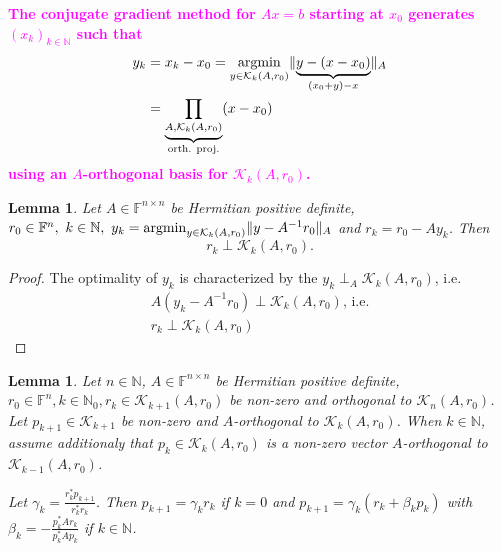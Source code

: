 \documentclass[12pt]{article}
\newtheorem{lemma}[theorem]{Lemma}
\theoremstyle{definition}
\theoremstyle{remark}
\numberwithin{equation}{section}
\newcommand{\F}{\mathbb{F}}
\newcommand{\N}{\mathbb{N}}
\newcommand{\K}{\mathcal{K}}
\DeclarePairedDelimiter{\norm}{\lVert}{\rVert}
\DeclareMathOperator{\argmin}{argmin}
\begin{document}
\begin{mdframed}[linecolor=magenta, linewidth=1pt]
  \textcolor{magenta}{\textbf{
      The conjugate gradient method for $Ax = b$ starting at $x_0$ generates $(x_k)_{k \in \N}$ such that
      \begin{align*}
        y_k &= x_k - x_0 = \argmin_{y \in \K_k(A,r_0)} \norm{\underbrace{y - (x - x_0)}_{(x_0+y)-x}}_A \\
        &= \underbrace{\prod_{A, \K_k(A,r_0)}}_{\text{orth. proj.}} (x - x_0)
      \end{align*}
      using an $A$-orthogonal basis for $\K_k(A,r_0)$.
  }}
\end{mdframed}
\begin{lemma}
  \label{lem:7.4}
  Let $A \in \F^{n\times n}$ be Hermitian positive definite, $r_0 \in \F^n,\ k \in \N,\ y_k = \argmin_{y \in \K_k(A,r_0)}\norm{y - A^{-1}r_0}_A$ and $r_k = r_0 - Ay_k$. Then
  \begin{equation*}
    r_k \perp \K_k(A,r_0).
  \end{equation*}
\end{lemma}
\begin{proof}
  The optimality of $y_k$ is characterized by the $y_k \perp_A \K_k(A,r_0)$, i.e.
  \begin{gather*}
    A(y_k - A^{-1}r_0) \perp \K_k(A,r_0) \text{, i.e.}\\
    r_k \perp \K_k(A,r_0)
  \end{gather*}
\end{proof}
\begin{lemma}
  \label{lem:7.5}
  Let $n \in \N$, $A \in \F^{n\times n}$ be Hermitian positive definite, $r_0 \in \F^n, k \in \N_0, r_k \in \mathcal{K}_{k+1}(A,r_0)$ be non-zero and orthogonal to $\mathcal{K}_n(A,r_0)$. Let $p_{k+1} \in \mathcal{K}_{k+1}$ be non-zero and $A$-orthogonal to $\K_k(A,r_0)$. When $k \in \N$, assume additionaly that $p_k \in \K_k(A,r_0)$ is a non-zero vector $A$-orthogonal to $\K_{k-1}(A,r_0)$.

  Let $\gamma_k = \frac{r_k^*p_{k+1}}{r_k^* r_k}$. Then $p_{k+1} = \gamma_k r_k$ if $k=0$ and $p_{k+1} = \gamma_k (r_k + \beta_k p_k)$ with $\beta_k = -\frac{p_k^* A r_k}{p_k^* A p_k}$ if $k \in \N$.
\end{lemma}
\end{document}
